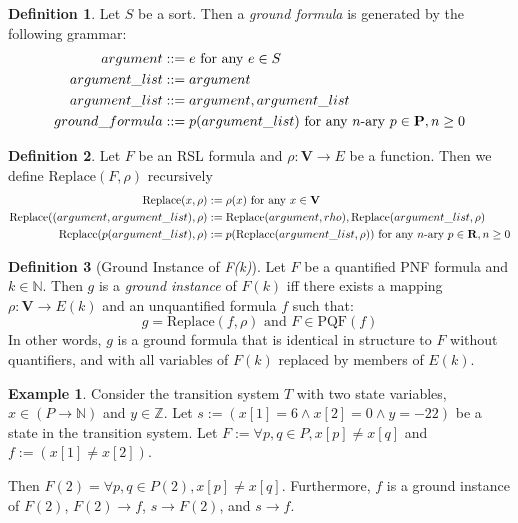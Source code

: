 \documentclass[12pt]{article}
\theoremstyle{definition}
\newtheorem{definition}{Definition}
\newtheorem{example}{Example}
\theoremstyle{remark}
\newcommand{\st}{\text{ }|\text{ }}
\newcommand{\PQF}{\text{PQF}}
\newcommand{\replace}{\text{Replace}}
\begin{document}
\begin{definition}
  Let $S$ be a sort.  Then a \textit{ground formula} is generated by the following grammar:
  \begin{align*}
    argument &::= e \hfill \text{ for any } e \in S\\
    argument\_list &::= argument\\
    argument\_list &::= argument,argument\_list\\
    ground\_formula &::= p(argument\_list) \hfill \text{ for any } n\text{-ary } p \in \mathbf{P}, n \geq 0\\
  \end{align*}
\end{definition}

\begin{definition}
  Let $F$ be an RSL formula and $\rho : \mathbf{V} \to E$ be a function.  Then we define $\replace(F,\rho)$ recursively
  \begin{align*}
    \replace(x,\rho) &:= \rho(x) \hfill \text{ for any } x \in \mathbf{V}\\
    \replace((argument,argument\_list),\rho) &:= \replace(argument,rho), \replace(argument\_list,\rho)\\
    \replace(p(argument\_list),\rho) &:= p(\replace(argument\_list,\rho)) \hfill \text{ for any } n\text{-ary } p \in \mathbf{R}, n \geq 0\\
  \end{align*}
\end{definition}

\begin{definition}[Ground Instance of \textit{F(k)}]
  Let $F$ be a quantified PNF formula and $k \in \mathbb{N}$.  Then $g$ is a \textit{ground instance} of $F(k)$ iff there exists a mapping $\rho : \mathbf{V} \to E(k)$ and an unquantified formula $f$ such that:
  $$g = \replace(f,\rho) \text{ and } F \in \PQF(f)$$
  In other words, $g$ is a ground formula that is identical in structure to $F$ without quantifiers, and with all variables of $F(k)$ replaced by members of $E(k)$.
\end{definition}

\begin{example}
  Consider the transition system $T$ with two state variables, $x \in (P \to \mathbb{N})$ and $y \in \mathbb{Z}$.  Let $s := (x[1]=6 \land x[2]=0 \land y=-22)$ be a state in the transition system.  Let $F := \forall p,q \in P, x[p] \neq x[q]$ and $f := (x[1] \neq x[2])$.

  Then $F(2) = \forall p,q \in P(2), x[p] \neq x[q]$.  Furthermore, $f$ is a ground instance of $F(2)$, $F(2) \rightarrow f$, $s \rightarrow F(2)$, and $s \rightarrow f$.
\end{example}
\end{document}
